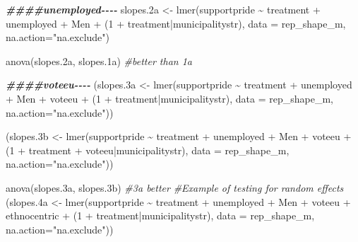 \documentclass[
]{article}
\newenvironment{Shaded}{\begin{snugshade}}{\end{snugshade}}
\newcommand{\AttributeTok}[1]{\textcolor[rgb]{0.77,0.63,0.00}{#1}}
\newcommand{\CommentTok}[1]{\textcolor[rgb]{0.56,0.35,0.01}{\textit{#1}}}
\newcommand{\DecValTok}[1]{\textcolor[rgb]{0.00,0.00,0.81}{#1}}
\newcommand{\DocumentationTok}[1]{\textcolor[rgb]{0.56,0.35,0.01}{\textbf{\textit{#1}}}}
\newcommand{\FloatTok}[1]{\textcolor[rgb]{0.00,0.00,0.81}{#1}}
\newcommand{\FunctionTok}[1]{\textcolor[rgb]{0.00,0.00,0.00}{#1}}
\newcommand{\NormalTok}[1]{#1}
\newcommand{\OtherTok}[1]{\textcolor[rgb]{0.56,0.35,0.01}{#1}}
\newcommand{\SpecialCharTok}[1]{\textcolor[rgb]{0.00,0.00,0.00}{#1}}
\newcommand{\StringTok}[1]{\textcolor[rgb]{0.31,0.60,0.02}{#1}}
\begin{document}
\begin{Shaded}
\begin{Highlighting}[]
\DocumentationTok{\#\#\#\#unemployed{-}{-}{-}{-}}
\NormalTok{slopes}\FloatTok{.2}\NormalTok{a }\OtherTok{\textless{}{-}} \FunctionTok{lmer}\NormalTok{(supportpride }\SpecialCharTok{\textasciitilde{}}\NormalTok{ treatment }\SpecialCharTok{+}\NormalTok{ unemployed }\SpecialCharTok{+}\NormalTok{ Men }\SpecialCharTok{+}\NormalTok{ (}\DecValTok{1} \SpecialCharTok{+}\NormalTok{ treatment}\SpecialCharTok{|}\NormalTok{municipalitystr),}
                  \AttributeTok{data =}\NormalTok{ rep\_shape\_m, }\AttributeTok{na.action=}\StringTok{"na.exclude"}\NormalTok{)}

\FunctionTok{anova}\NormalTok{(slopes}\FloatTok{.2}\NormalTok{a, slopes}\FloatTok{.1}\NormalTok{a) }\CommentTok{\#better than 1a}

\DocumentationTok{\#\#\#\#voteeu{-}{-}{-}{-}}
\NormalTok{(slopes}\FloatTok{.3}\NormalTok{a }\OtherTok{\textless{}{-}} \FunctionTok{lmer}\NormalTok{(supportpride }\SpecialCharTok{\textasciitilde{}}\NormalTok{ treatment }\SpecialCharTok{+}\NormalTok{ unemployed }\SpecialCharTok{+}\NormalTok{ Men }\SpecialCharTok{+}\NormalTok{ voteeu }\SpecialCharTok{+}\NormalTok{ (}\DecValTok{1} \SpecialCharTok{+}\NormalTok{ treatment}\SpecialCharTok{|}\NormalTok{municipalitystr),}
                   \AttributeTok{data =}\NormalTok{ rep\_shape\_m, }\AttributeTok{na.action=}\StringTok{"na.exclude"}\NormalTok{))}

\NormalTok{(slopes}\FloatTok{.3}\NormalTok{b }\OtherTok{\textless{}{-}} \FunctionTok{lmer}\NormalTok{(supportpride }\SpecialCharTok{\textasciitilde{}}\NormalTok{ treatment }\SpecialCharTok{+}\NormalTok{ unemployed }\SpecialCharTok{+}\NormalTok{ Men }\SpecialCharTok{+}\NormalTok{ voteeu }\SpecialCharTok{+}\NormalTok{ (}\DecValTok{1} \SpecialCharTok{+}\NormalTok{ treatment }\SpecialCharTok{+}\NormalTok{ voteeu}\SpecialCharTok{|}\NormalTok{municipalitystr),}
                   \AttributeTok{data =}\NormalTok{ rep\_shape\_m, }\AttributeTok{na.action=}\StringTok{"na.exclude"}\NormalTok{))}

\FunctionTok{anova}\NormalTok{(slopes}\FloatTok{.3}\NormalTok{a, slopes}\FloatTok{.3}\NormalTok{b) }\CommentTok{\#3a better}
\CommentTok{\#Example of testing for random effects}
\NormalTok{(slopes}\FloatTok{.4}\NormalTok{a }\OtherTok{\textless{}{-}} \FunctionTok{lmer}\NormalTok{(supportpride }\SpecialCharTok{\textasciitilde{}}\NormalTok{ treatment }\SpecialCharTok{+}\NormalTok{ unemployed }\SpecialCharTok{+}\NormalTok{ Men }\SpecialCharTok{+}\NormalTok{ voteeu }\SpecialCharTok{+}\NormalTok{ ethnocentric }\SpecialCharTok{+}\NormalTok{ (}\DecValTok{1} \SpecialCharTok{+}\NormalTok{ treatment}\SpecialCharTok{|}\NormalTok{municipalitystr),}
                   \AttributeTok{data =}\NormalTok{ rep\_shape\_m, }\AttributeTok{na.action=}\StringTok{"na.exclude"}\NormalTok{))}


\end{Highlighting}
\end{Shaded}
\end{document}
